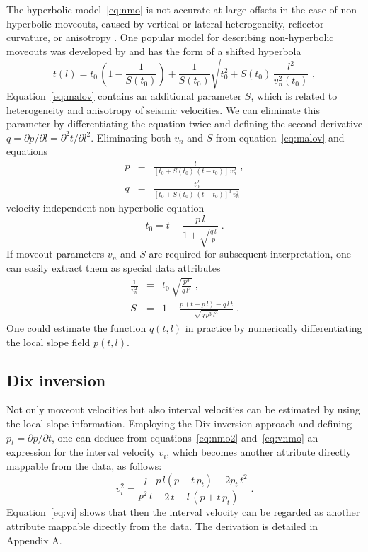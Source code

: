 The hyperbolic model~\ref{eq:nmo} is not accurate at large offsets in the
case of non-hyperbolic moveouts, caused by vertical or lateral heterogeneity,
reflector curvature, or anisotropy \cite[]{grechka}. One popular model for
describing non-hyperbolic moveouts was developed by \cite{ussr} and has the
form of a shifted hyperbola
\cite[]{GEO53-02-01430157,GEO59-06-09830999,SEG-2000-22452248}
\begin{equation}
  \label{eq:malov}
  t(l) = t_0\,\left(1-\frac{1}{S(t_0)}\right) + 
  \frac{1}{S(t_0)}\sqrt{t_0^2 + S(t_0)\,\frac{l^2}{v_n^2(t_0)}}\;,
\end{equation}
Equation~\ref{eq:malov} contains an additional parameter $S$, which
is related to heterogeneity and anisotropy of seismic velocities. We
can eliminate this parameter by differentiating the equation twice and
defining the second derivative $q = \partial p/\partial l = \partial^2
t/ \partial l^2$. 
Eliminating both $v_n$ and $S$ from equation~\ref{eq:malov} and  equations 
\begin{eqnarray}
  \label{eq:pn}
  p & = & \frac{l}{\left[t_0 + S(t_0)\,\left(t-t_0\right)\right]\,v_n^2}\;, \\
  \label{eq:qn}
  q & = & \frac{t_0^2}{\left[t_0 + S(t_0)\,\left(t-t_0\right)\right]^3\,v_n^2}\; 
\end{eqnarray}
 
velocity-independent non-hyperbolic   equation 
\begin{equation}
  t_0 = t - \frac{p\,l}{1 + \sqrt{\frac{q\,l}{p}}}\;.
\end{equation}
If  moveout parameters $v_n$ and $S$ are required for subsequent
interpretation, one can easily extract them as special data attributes
\begin{eqnarray}
  \frac{1}{v_n^2} & = & t_0\,\sqrt{\frac{p^3}{q\,l^3}}\;, \\
  S & = & 1 + \frac{p\,(t - p\,l) - q\,l\,t}{\sqrt{q\,p^3\,l^3}}\;.
\end{eqnarray}
One could estimate the function $q(t,l)$ in practice by numerically
differentiating the local slope field $p(t,l)$.

\subsection{Dix inversion}
Not only moveout velocities but also interval velocities can be
estimated by using the local slope information. 
Employing the Dix inversion approach \cite[]{GEO20-01-00680086}
and defining $p_t = \partial p/\partial t$, one can deduce from
equations~\ref{eq:nmo2} and~\ref{eq:vnmo} an expression for the
interval velocity $v_i$, which becomes another attribute directly
mappable from the data, as follows:
\begin{equation}
  \label{eq:vi}
  v_i^2 = %
  \frac{l}{p^2\,t}\,
  \frac{p\,l (p + t\,p_t) - 2 p_t\,t^2}{2\,t - l\,(p + t\,p_t)}\;.
\end{equation}
Equation~\ref{eq:vi} shows that then the interval velocity can be
regarded as another attribute mappable directly from the data. The
derivation is detailed in Appendix A.

